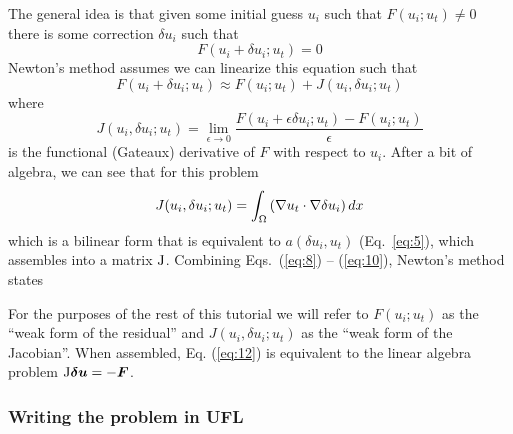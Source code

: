 The general idea is that given some initial guess $u_{i}$ such that
$F(u_{i}; u_{t}) \neq 0$ there is some correction $\delta u_{i}$ such
that
\begin{equation}
  \label{eq:8}
  F(u_{i} + \delta u_{i}; u_{t}) = 0
\end{equation}
Newton's method assumes we can linearize this equation such that
\begin{equation}
  \label{eq:9}
   F(u_{i} + \delta u_{i}; u_{t}) \approx F(u_{i};u_{t}) +
   J(u_{i},\delta u_{i}; u_{t})
\end{equation}
where 
\begin{equation}
  \label{eq:10}
  J(u_{i},\delta u_{i}; u_{t}) = \lim_{\epsilon\rightarrow 0}
  \frac{F(u_{i}+\epsilon\delta u_{i};u_{t}) - F(u_{i};u_{t})}{\epsilon}
\end{equation}
is the functional (Gateaux) derivative of $F$ with respect to
$u_{i}$.  After a bit of algebra, we can see that for this problem
\begin{equation}
  \label{eq:11}
  J(u_{i},\delta u_{i}; u_{t}) = \int_{\Omega} \left(
    \nabla u_{t}\cdot\nabla \delta u_{i} \right)dx
\end{equation}
which is a bilinear form that is equivalent to $a(\delta u_{i},u_{t})$
(Eq.\ \ref{eq:5}), which assembles into a matrix $\mathrm{J}$. Combining Eqs.\
(\ref{eq:8}) -- (\ref{eq:10}), Newton's method
states
\begin{quote}
\end{quote}
For the purposes of the rest of this tutorial we will refer to
$F(u_{i};u_{t})$ as the ``weak form of the residual'' and
$J(u_{i},\delta u_{i};u_{t})$ as the ``weak form of the
Jacobian''.  When assembled, Eq. (\ref{eq:12}) is equivalent to the
linear algebra problem $\mathrm{J}{\mbox{\boldmath$\delta u$}} = -{\mbox{\boldmath$F$}}$.

\subsubsection{Writing the problem in UFL}
\label{sec:writing-problem-ufl}

